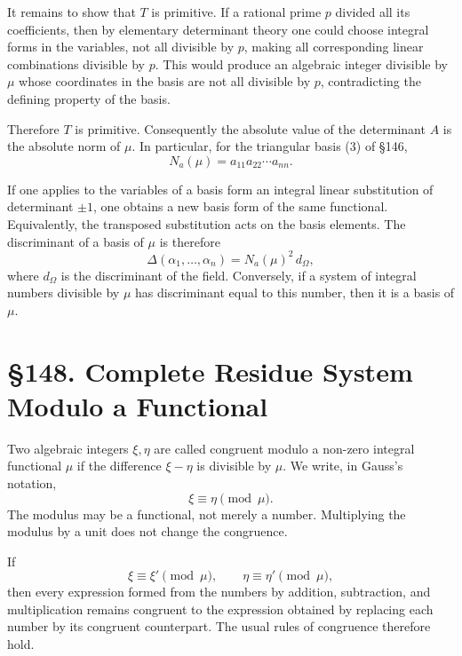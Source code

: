 \documentclass[11pt,a4paper]{book}
\newcommand{\webersection}[2]{\clearpage\section*{\S #1. #2}}
\begin{document}
It remains to show that \(T\) is primitive.  If a rational prime \(p\) divided all its coefficients, then by elementary determinant theory one could choose integral forms in the variables, not all divisible by \(p\), making all corresponding linear combinations divisible by \(p\).  This would produce an algebraic integer divisible by \(\mu\) whose coordinates in the basis are not all divisible by \(p\), contradicting the defining property of the basis.

Therefore \(T\) is primitive.  Consequently the absolute value of the determinant \(A\) is the absolute norm of \(\mu\).  In particular, for the triangular basis (3) of \S 146,
\begin{equation}
 N_a(\mu)=a_{11}a_{22}
\cdots a_{nn}. \tag{5}
\end{equation}

If one applies to the variables of a basis form an integral linear substitution of determinant \(\pm1\), one obtains a new basis form of the same functional.  Equivalently, the transposed substitution acts on the basis elements.  The discriminant of a basis of \(\mu\) is therefore
\begin{equation}
 \Delta(\alpha_1,
\ldots,
\alpha_n)=N_a(\mu)^2\,d_\Omega, \tag{6}
\end{equation}
where \(d_\Omega\) is the discriminant of the field.  Conversely, if a system of integral numbers divisible by \(\mu\) has discriminant equal to this number, then it is a basis of \(\mu\).

\webersection{148}{Complete Residue System Modulo a Functional}

Two algebraic integers \(\xi,\eta\) are called congruent modulo a non-zero integral functional \(\mu\) if the difference \(\xi-
\eta\) is divisible by \(\mu\).  We write, in Gauss's notation,
\begin{equation}
 \xi\equiv\eta\pmod{\mu}. \tag{1}
\end{equation}
The modulus may be a functional, not merely a number.  Multiplying the modulus by a unit does not change the congruence.

If
\[
 \xi\equiv\xi'\pmod{\mu},
\qquad
 \eta\equiv\eta'\pmod{\mu},
\]
then every expression formed from the numbers by addition, subtraction, and multiplication remains congruent to the expression obtained by replacing each number by its congruent counterpart.  The usual rules of congruence therefore hold.
\end{document}
